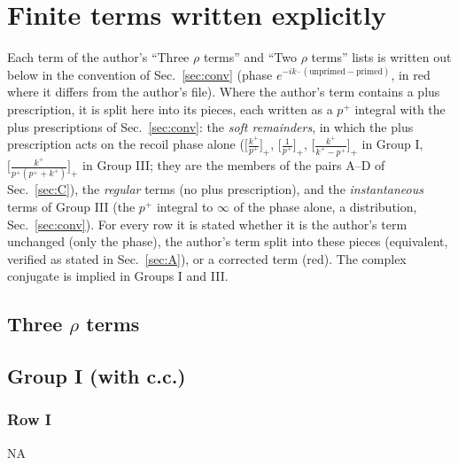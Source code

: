 \section{Finite terms written explicitly}\label{sec:B}
\noindent Each term of the author's ``Three $\rho$ terms'' and ``Two $\rho$ terms'' lists is written out below in the convention of Sec.~\ref{sec:conv} (phase $e^{-ik\cdot(\text{unprimed}-\text{primed})}$, in red where it differs from the author's file). Where the author's term contains a plus prescription, it is split here into its pieces, each written as a $p^{+}$ integral with the plus prescriptions of Sec.~\ref{sec:conv}: the \emph{soft remainders}, in which the plus prescription acts on the recoil phase alone ($\big[\frac{k^{+}}{p^{+}}\big]_{+}$, $\big[\frac{1}{p^{+}}\big]_{+}$, $\big[\frac{k^{+}}{k^{+}-p^{+}}\big]_{+}$ in Group I, $\big[\frac{k^{+}}{p^{+}(p^{+}+k^{+})}\big]_{+}$ in Group III; they are the members of the pairs A--D of Sec.~\ref{sec:C}), the \emph{regular} terms (no plus prescription), and the \emph{instantaneous} terms of Group III (the $p^{+}$ integral to $\infty$ of the phase alone, a distribution, Sec.~\ref{sec:conv}). For every row it is stated whether it is the author's term unchanged (only the phase), the author's term split into these pieces (equivalent, verified as stated in Sec.~\ref{sec:A}), or a corrected term (red). The complex conjugate is implied in Groups I and III.

\subsection*{Three $\rho$ terms}
\subsection{Group I (with c.c.)}
\subsubsection*{Row I} \textsc{NA}
